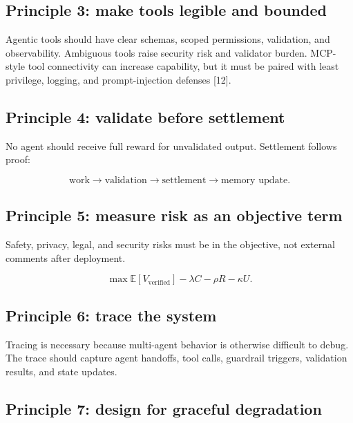 \documentclass[
  11pt,
]{article}
\begin{document}
\subsection{Principle 3: make tools legible and
bounded}\label{principle-3-make-tools-legible-and-bounded}

Agentic tools should have clear schemas, scoped permissions, validation,
and observability. Ambiguous tools raise security risk and validator
burden. MCP-style tool connectivity can increase capability, but it must
be paired with least privilege, logging, and prompt-injection defenses
{[}12{]}.

\subsection{Principle 4: validate before
settlement}\label{principle-4-validate-before-settlement}

No agent should receive full reward for unvalidated output. Settlement
follows proof:

\[
\text{work}\rightarrow\text{validation}\rightarrow\text{settlement}\rightarrow\text{memory update}.
\]

\subsection{Principle 5: measure risk as an objective
term}\label{principle-5-measure-risk-as-an-objective-term}

Safety, privacy, legal, and security risks must be in the objective, not
external comments after deployment.

\[
\max \mathbb{E}[V_{\text{verified}}]-\lambda C-\rho R-\kappa U.
\]

\subsection{Principle 6: trace the
system}\label{principle-6-trace-the-system}

Tracing is necessary because multi-agent behavior is otherwise difficult
to debug. The trace should capture agent handoffs, tool calls, guardrail
triggers, validation results, and state updates.

\subsection{Principle 7: design for graceful
degradation}\label{principle-7-design-for-graceful-degradation}
\end{document}
